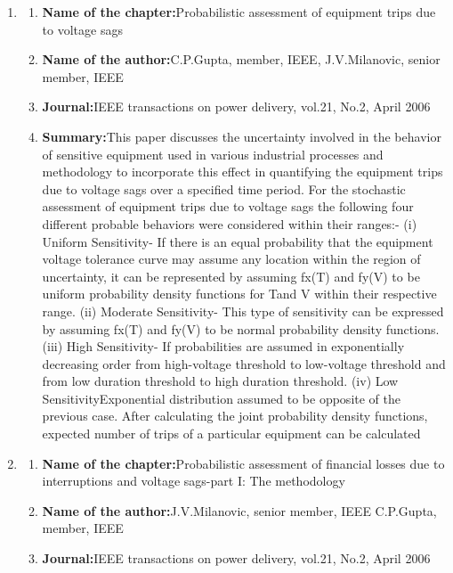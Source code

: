 \documentclass[14pt, a4paper]{extreport}
\begin{document}
\begin{enumerate}
\begin{enumerate}
    
    \end{enumerate}
    \item
    \begin{enumerate}
    \item{\textbf{Name of the chapter:}}Probabilistic
assessment of
equipment trips
due to voltage
sags
\item{\textbf{Name of the author:}}C.P.Gupta,
member, IEEE,
J.V.Milanovic,
senior member,
IEEE
\item{\textbf{Journal:}}IEEE
transactions
on power
delivery,
vol.21, No.2,
April 2006
\item{\textbf{Summary:}}This paper discusses the
uncertainty involved in the
behavior of sensitive
equipment used in various
industrial processes and
methodology to
incorporate this effect in
quantifying the equipment
trips due to voltage sags
over a specified time
period. For the stochastic
assessment of equipment
trips due to voltage sags
the following four
different probable
behaviors were considered
within their ranges:-
(i) Uniform Sensitivity- If
there is an equal
probability that the
equipment voltage
tolerance curve may
assume any location
within the region of
uncertainty, it can be represented by assuming
fx(T) and fy(V) to be
uniform probability
density functions for Tand
V within their respective
range. (ii) Moderate
Sensitivity- This type of
sensitivity can be
expressed by assuming
fx(T) and fy(V) to be
normal probability density
functions. (iii) High
Sensitivity- If probabilities
are assumed in
exponentially decreasing
order from high-voltage
threshold to low-voltage
threshold and from low
duration threshold to high
duration threshold. (iv)
Low SensitivityExponential
distribution
assumed to be opposite of
the previous case. After
calculating the joint
probability density
functions, expected
number of trips of a
particular equipment can be calculated
    \end{enumerate}
    \item
    \begin{enumerate}
     \item{\textbf{Name of the chapter:}}Probabilistic
assessment of
financial losses
due to
interruptions
and voltage
sags-part I: The
methodology
\item{\textbf{Name of the author:}}J.V.Milanovic,
senior member,
IEEE
C.P.Gupta,
member, IEEE
\item{\textbf{Journal:}}IEEE
transactions
on power
delivery,
vol.21, No.2,
April 2006


\end{enumerate}
\end{enumerate}
\end{document}
